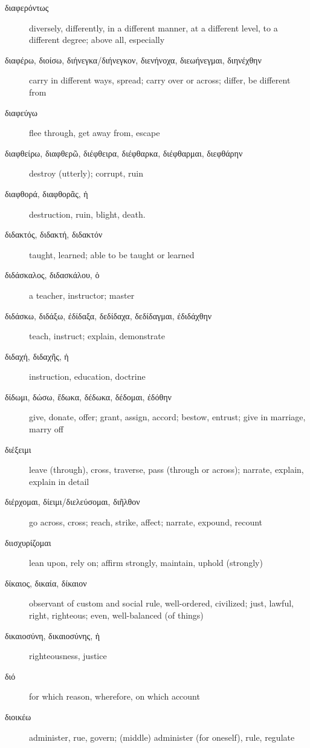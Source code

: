\documentclass[12pt,letterpaper]{article}
\begin{document}
\begin{description}
    \item[\textgreek{διαφερόντως}] diversely, differently, in a different manner, at a different level, to a different degree; above all, especially
    \item[\textgreek{διαφέρω, διοίσω, διήνεγκα/διήνεγκον, διενήνοχα, διεωήνεγμαι, διηνέχθην}] \marginnote{*}carry in different ways, spread; carry over or across; differ, be different from
    \item[\textgreek{διαφεύγω}] flee through, get away from, escape
    \item[\textgreek{διαφθείρω, διαφθερῶ, διέφθειρα, διέφθαρκα, διέφθαρμαι, διεφθάρην}] \marginnote{*}destroy (utterly); corrupt, ruin
    \item[\textgreek{διαφθορά, διαφθορᾶς, ἡ}] destruction, ruin, blight, death.
    \item[\textgreek{διδακτός, διδακτή, διδακτόν}] taught, learned; able to be taught or learned
    \item[\textgreek{διδάσκαλος, διδασκάλου, ὁ}] a teacher, instructor; master
    \item[\textgreek{διδάσκω, διδάξω, ἐδίδαξα, δεδίδαχα, δεδίδαγμαι, ἐδιδάχθην}] \marginnote{*}teach, instruct; explain, demonstrate
    \item[\textgreek{διδαχή, διδαχῆς, ἡ}] instruction, education, doctrine
    \item[\textgreek{δίδωμι, δώσω, ἔδωκα, δέδωκα, δέδομαι, ἐδόθην}] \marginnote{*}give, donate, offer; grant, assign, accord; bestow, entrust; give in marriage, marry off
    \item[\textgreek{διέξειμι}] leave (through), cross, traverse, pass (through or across); narrate, explain, explain in detail 
    \item[\textgreek{διέρχομαι, δίειμι/διελεύσομαι, διῆλθον}] go across, cross; reach, strike, affect; narrate, expound, recount
    \item[\textgreek{διισχυρίζομαι}] lean upon, rely on; affirm strongly, maintain, uphold (strongly)
    \item[\textgreek{δίκαιος, δικαία, δίκαιον}] \marginnote{*}observant of custom and social rule, well-ordered, civilized; just, lawful, right, righteous; even, well-balanced (of things)
    \item[\textgreek{δικαιοσύνη, δικαιοσύνης, ἡ}] righteousness, justice
    \item[\textgreek{διό}] for which reason, wherefore, on which account
    \item[\textgreek{διοικέω}] administer, rue, govern; (middle) administer (for oneself), rule, regulate

\end{description}
\end{document}

